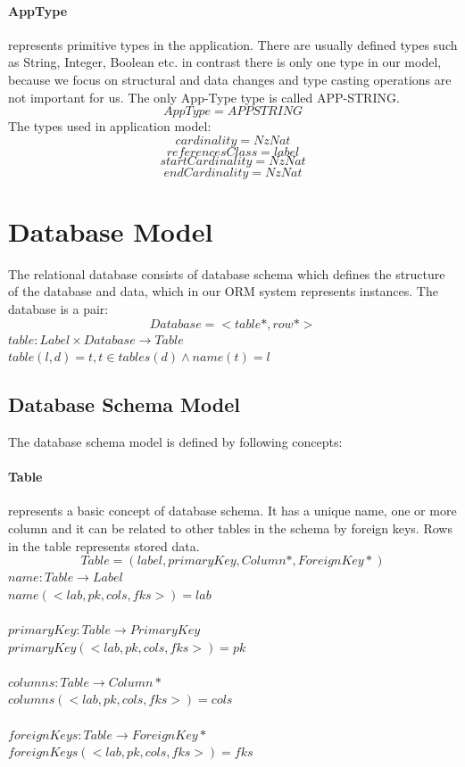 \documentclass[11pt]{article}
\begin{document}
\paragraph{AppType} represents primitive types in the application. There are usually defined types such as String, Integer, Boolean etc. in contrast there is only one type in our model, because we focus on structural and data changes and type casting operations are not important for us. The only App-Type type is called APP-STRING.
$$
AppType = APPSTRING
$$
The types used in application model:
$$
cardinality = NzNat
$$
$$
referencesClass = label
$$
$$
startCardinality = NzNat
$$
$$
endCardinality = NzNat
$$


\section{Database Model}
The relational database consists of database schema which defines the structure of the database and data, which in our ORM system represents instances. The database is a pair:
$$
Database = <table*, row*>
$$
$table : Label \times Database \rightarrow Table $ \\
$table(l, d) = t, t \in tables(d) \wedge name(t) = l$ \\

\subsection{Database Schema Model}
The database schema model is defined by following concepts:
\paragraph{Table} represents a basic concept of database schema. It has a unique name, one or more column and it can be related to other tables in the schema by foreign keys. Rows in the table represents stored data.
$$
Table = (label, primaryKey, Column*, ForeignKey*)
$$
$name : Table \rightarrow Label $ \\
$name(< lab, pk, cols, fks  >) = lab$ \\ \\
$primaryKey : Table \rightarrow PrimaryKey $ \\
$primaryKey(< lab, pk, cols, fks  >) = pk$ \\ \\
$columns : Table \rightarrow Column* $ \\
$columns(< lab, pk, cols, fks  >) = cols$ \\ \\
$foreignKeys : Table \rightarrow ForeignKey* $ \\
$foreignKeys(< lab, pk, cols, fks  >) = fks$ 
\end{document}
